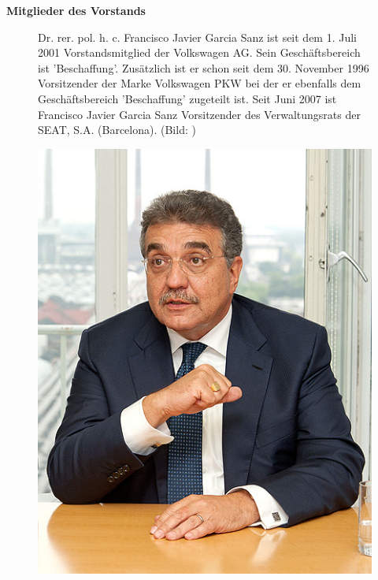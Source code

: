 \documentclass[12pt]{article}
\begin{document}
\textbf{Mitglieder des Vorstands}
\begin{figure}[!h]
	\centering
	\begin{minipage}[h]{0.65\textwidth}
		Dr. rer. pol. h. c. Francisco Javier Garcia Sanz ist seit dem 1. Juli 2001 Vorstandsmitglied der Volkswagen AG. Sein Geschäftsbereich ist 'Beschaffung'. Zusätzlich ist er schon seit dem 30. November 1996 Vorsitzender der Marke Volkswagen PKW bei der er ebenfalls dem Geschäftsbereich 'Beschaffung' zugeteilt ist. Seit Juni 2007 ist Francisco Javier Garcia Sanz Vorsitzender des Verwaltungsrats der SEAT, S.A. (Barcelona). (Bild: \cite{fspic} )
	\end{minipage}
		\begin{minipage}[h]{0.10\textwidth}
		\hspace{1cm}
	\end{minipage}
	\begin{minipage}[h]{0.20\textwidth}
		\centering
		\includegraphics[width=1.0\textwidth]{images/FranciscoSanz.jpg}
		\label{fig:vorstandvw1}
	\end{minipage}
\end{figure}
\end{document}
